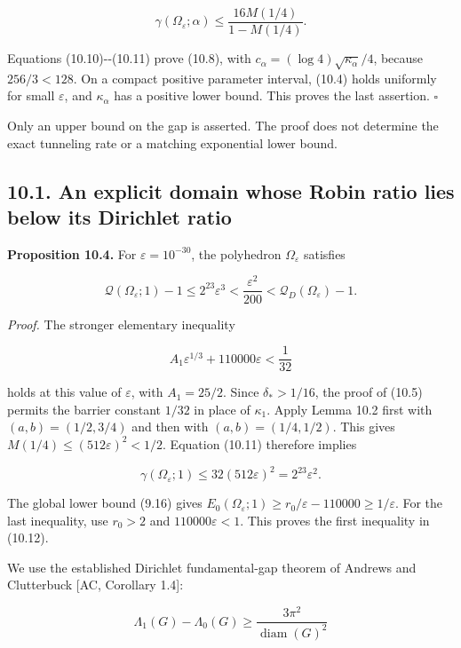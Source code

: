 \documentclass[11pt]{article}
\begin{document}
\[
\gamma(\Omega_\varepsilon;\alpha)
\le\frac{16M(1/4)}{1-M(1/4)}.
\tag{10.11}
\]

Equations (10.10)-\/-(10.11) prove (10.8), with
\(c_\alpha=(\log4)\sqrt{\kappa_\alpha}/4\), because \(256/3<128\). On a
compact positive parameter interval, (10.4) holds uniformly for small
\(\varepsilon\), and \(\kappa_\alpha\) has a positive lower bound. This
proves the last assertion. \(\square\)

Only an upper bound on the gap is asserted. The proof does not determine
the exact tunneling rate or a matching exponential lower bound.

\subsection{10.1. An explicit domain whose Robin ratio lies below its
Dirichlet
ratio}\label{an-explicit-domain-whose-robin-ratio-lies-below-its-dirichlet-ratio}

\textbf{Proposition 10.4.} For \(\varepsilon=10^{-30}\), the polyhedron
\(\Omega_\varepsilon\) satisfies

\[
\mathcal Q(\Omega_\varepsilon;1)-1
\le2^{23}\varepsilon^3
<\frac{\varepsilon^2}{200}
<\mathcal Q_D(\Omega_\varepsilon)-1.
\tag{10.12}
\]

\emph{Proof.} The stronger elementary inequality

\[
A_1\varepsilon^{1/3}+110000\varepsilon<\frac1{32}
\tag{10.13}
\]

holds at this value of \(\varepsilon\), with \(A_1=25/2\). Since
\(\delta_*>1/16\), the proof of (10.5) permits the barrier constant
\(1/32\) in place of \(\kappa_1\). Apply Lemma 10.2 first with
\((a,b)=(1/2,3/4)\) and then with \((a,b)=(1/4,1/2)\). This gives
\(M(1/4)\le(512\varepsilon)^2<1/2\). Equation (10.11) therefore implies

\[
\gamma(\Omega_\varepsilon;1)
\le32(512\varepsilon)^2=2^{23}\varepsilon^2.
\tag{10.14}
\]

The global lower bound (9.16) gives
\(E_0(\Omega_\varepsilon;1)\ge r_0/\varepsilon-110000\ge1/\varepsilon\).
For the last inequality, use \(r_0>2\) and \(110000\varepsilon<1\). This
proves the first inequality in (10.12).

We use the established Dirichlet fundamental-gap theorem of Andrews and
Clutterbuck {[}AC, Corollary 1.4{]}:

\[
\Lambda_1(G)-\Lambda_0(G)\ge\frac{3\pi^2}{\operatorname{diam}(G)^2}
\tag{10.15}
\]
\end{document}
